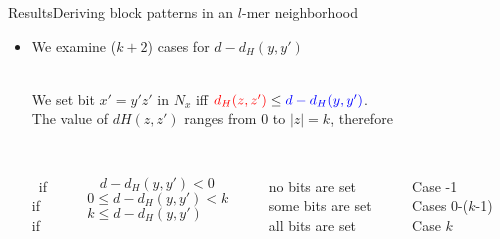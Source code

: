 \documentclass[pdf,xcolor={dvipsnames}]{beamer}
\begin{document}
\begin{frame}{Results}{Deriving block patterns in an $l$-mer neighborhood}
\begin{itemize}
{\begin{equation*}
			\text{ for }x' = y'z'.
			\end{equation*}\ \\
			The condition for setting a bit in $N_x$ is now
				\begin{center}{
				\ \ \ ${\color{blue}d_H(y,y')} + {\color{red}d_H(z,z')} \leq d$\\
				or, ${\color{red}d_H(z,z')} \leq {\color{blue}d - d_H(y,y')}$\\
				}\end{center}\ \\
			}
		\item<1,5> { We examine ($k + 2$) cases for $d-d_H(y,y')$}
			\only<5> {\\We set bit $x' = y'z'$ in $N_x$ iff ${\color{red}d_H(z,z')} \leq {\color{blue}d - d_H(y,y')}$.
				\\The value of {\color{red} $dH(z,z')$} ranges from 0 to $|z|=k$, therefore\\\ \\
				
				\begin{columns}

					\begin{column}{0.1\textwidth}
					\
					if\\
					if\\
					if\\
					\end{column}
					\begin{column}{0.33\textwidth}
					\centering
					$\ \ \ \ d-d_H(y,y') < 0$\\
					$0 \leq d-d_H(y,y') < k$ \\
					$k \leq d-d_H(y,y')\ \ \ \ $\\
					\end{column}
					\begin{column}{0.25\textwidth}
					no bits are set\\
					some bits are set\\
					all bits are set\\
					\end{column}
					\begin{column}{0.23\textwidth}
					Case -1\\
					Cases 0-($k$-1)\\
					Case $k$\\
					\end{column}
				\end{columns}
			}
		\end{itemize}
		\end{frame}
\end{document}
